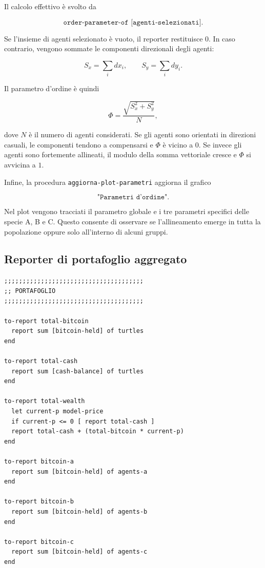 Il calcolo effettivo è svolto da

\[
\texttt{order-parameter-of [agenti-selezionati]}.
\]

Se l'insieme di agenti selezionato è vuoto, il reporter restituisce \(0\). In caso
contrario, vengono sommate le componenti direzionali degli agenti:

\[
S_x = \sum_i dx_i,
\qquad
S_y = \sum_i dy_i.
\]

Il parametro d'ordine è quindi

\[
\Phi =
\frac{\sqrt{S_x^2+S_y^2}}{N},
\]

dove \(N\) è il numero di agenti considerati. Se gli agenti sono orientati in
direzioni casuali, le componenti tendono a compensarsi e \(\Phi\) è vicino a
\(0\). Se invece gli agenti sono fortemente allineati, il modulo della somma
vettoriale cresce e \(\Phi\) si avvicina a \(1\).

Infine, la procedura \texttt{aggiorna-plot-parametri} aggiorna il grafico

\[
\texttt{"Parametri d'ordine"}.
\]

Nel plot vengono tracciati il parametro globale e i tre parametri specifici delle
specie A, B e C. Questo consente di osservare se l'allineamento emerge in tutta la
popolazione oppure solo all'interno di alcuni gruppi.

\subsection{Reporter di portafoglio aggregato}

\begin{lstlisting}[caption={Reporter per Bitcoin, liquidità e ricchezza complessiva degli agenti}]
;;;;;;;;;;;;;;;;;;;;;;;;;;;;;;;;;;;;;;
;; PORTAFOGLIO
;;;;;;;;;;;;;;;;;;;;;;;;;;;;;;;;;;;;;;

to-report total-bitcoin
  report sum [bitcoin-held] of turtles
end

to-report total-cash
  report sum [cash-balance] of turtles
end

to-report total-wealth
  let current-p model-price
  if current-p <= 0 [ report total-cash ]
  report total-cash + (total-bitcoin * current-p)
end

to-report bitcoin-a
  report sum [bitcoin-held] of agents-a
end

to-report bitcoin-b
  report sum [bitcoin-held] of agents-b
end

to-report bitcoin-c
  report sum [bitcoin-held] of agents-c
end
\end{lstlisting}

